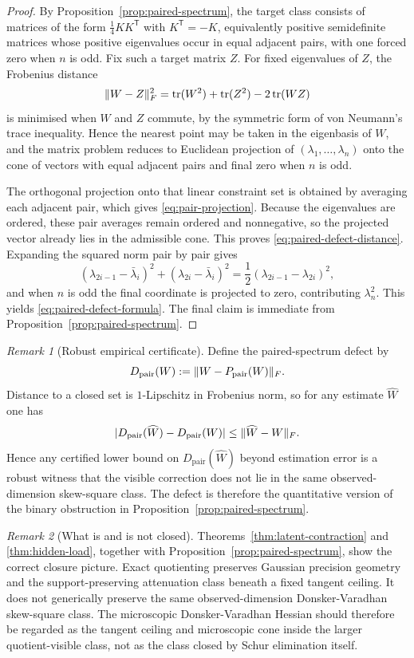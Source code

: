 \documentclass[11pt]{article}
\numberwithin{equation}{section}
\DeclarePairedDelimiter{\abs}{\lvert}{\rvert}
\DeclarePairedDelimiter{\norm}{\lVert}{\rVert}
\theoremstyle{thmcompact}
\theoremstyle{remark}
\newtheorem*{remarkplain}{Remark}
\newenvironment{remark}[1][]%
{\begin{remarkbox}\begin{remarkplain}[#1]\normalfont}
		{\end{remarkplain}\end{remarkbox}}
\begin{document}
\begin{proof}
By Proposition~\ref{prop:paired-spectrum}, the target class consists of matrices of the form $\tfrac14 K K^{\mathsf T}$ with $K^{\mathsf T}=-K$, equivalently positive semidefinite matrices whose positive eigenvalues occur in equal adjacent pairs, with one forced zero when $n$ is odd. Fix such a target matrix $Z$. For fixed eigenvalues of $Z$, the Frobenius distance
\[
\norm{W-Z}_F^2=\operatorname{tr}(W^2)+\operatorname{tr}(Z^2)-2\operatorname{tr}(WZ)
\]
is minimised when $W$ and $Z$ commute, by the symmetric form of von Neumann's trace inequality. Hence the nearest point may be taken in the eigenbasis of $W$, and the matrix problem reduces to Euclidean projection of $(\lambda_1,\dots,\lambda_n)$ onto the cone of vectors with equal adjacent pairs and final zero when $n$ is odd.

The orthogonal projection onto that linear constraint set is obtained by averaging each adjacent pair, which gives \eqref{eq:pair-projection}. Because the eigenvalues are ordered, these pair averages remain ordered and nonnegative, so the projected vector already lies in the admissible cone. This proves \eqref{eq:paired-defect-distance}. Expanding the squared norm pair by pair gives
\[
(\lambda_{2i-1}-\bar\lambda_i)^2+(\lambda_{2i}-\bar\lambda_i)^2
=\frac12(\lambda_{2i-1}-\lambda_{2i})^2,
\]
and when $n$ is odd the final coordinate is projected to zero, contributing $\lambda_n^2$. This yields \eqref{eq:paired-defect-formula}. The final claim is immediate from Proposition~\ref{prop:paired-spectrum}.\qedhere
\end{proof}

\begin{remark}[Robust empirical certificate]
Define the paired-spectrum defect by
\[
D_{\mathrm{pair}}(W):=\norm{W-P_{\mathrm{pair}}(W)}_F.
\]
Distance to a closed set is $1$-Lipschitz in Frobenius norm, so for any estimate $\widehat W$ one has
\[
\abs{D_{\mathrm{pair}}(\widehat W)-D_{\mathrm{pair}}(W)}\le \norm{\widehat W-W}_F.
\]
Hence any certified lower bound on $D_{\mathrm{pair}}(\widehat W)$ beyond estimation error is a robust witness that the visible correction does not lie in the same observed-dimension skew-square class. The defect is therefore the quantitative version of the binary obstruction in Proposition~\ref{prop:paired-spectrum}.
\end{remark}

\begin{remark}[What is and is not closed]
Theorems~\ref{thm:latent-contraction} and \ref{thm:hidden-load}, together with Proposition~\ref{prop:paired-spectrum}, show the correct closure picture. Exact quotienting preserves Gaussian precision geometry and the support-preserving attenuation class beneath a fixed tangent ceiling. It does not generically preserve the same observed-dimension Donsker-Varadhan skew-square class. The microscopic Donsker-Varadhan Hessian should therefore be regarded as the tangent ceiling and microscopic cone inside the larger quotient-visible class, not as the class closed by Schur elimination itself.
\end{remark}
\end{document}
